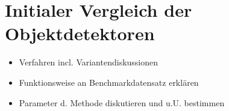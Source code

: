 \section{Initialer Vergleich der Objektdetektoren}

\begin{itemize}
	\item Verfahren incl. Variantendiskussionen
	\item Funktionsweise an Benchmarkdatensatz erklären
	\item Parameter d. Methode diskutieren und u.U. bestimmen
\end{itemize}

